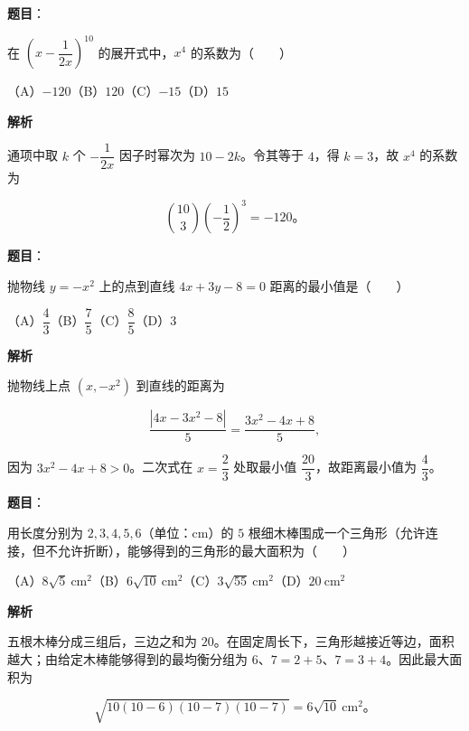 \begin{answer}

\textbf{题目}：

在 $\left(x-\dfrac1{2x}\right)^{10}$ 的展开式中，$x^4$ 的系数为\mbox{（　　）}

（A）$-120$\quad（B）$120$\quad（C）$-15$\quad（D）$15$

\textbf{解析}

通项中取 $k$ 个 $-\dfrac1{2x}$ 因子时幂次为 $10-2k$。令其等于 $4$，得 $k=3$，故 $x^4$ 的系数为

\nopagebreak[4]
\[
\binom{10}{3}\left(-\frac12\right)^3=-120\text{。}
\]


\end{answer}
\begin{answer}

\textbf{题目}：

抛物线 $y=-x^2$ 上的点到直线 $4x+3y-8=0$ 距离的最小值是\mbox{（　　）}

（A）$\dfrac43$\quad（B）$\dfrac75$\quad（C）$\dfrac85$\quad（D）$3$

\textbf{解析}

抛物线上点 $(x,-x^2)$ 到直线的距离为

\nopagebreak[4]
\[
\frac{|4x-3x^2-8|}{5}
=\frac{3x^2-4x+8}{5},
\]

因为 $3x^2-4x+8>0$。二次式在 $x=\dfrac23$ 处取最小值 $\dfrac{20}{3}$，故距离最小值为 $\dfrac43$。


\end{answer}
\begin{answer}

\textbf{题目}：

用长度分别为 $2,3,4,5,6$（单位：cm）的 $5$ 根细木棒围成一个三角形（允许连接，但不允许折断），能够得到的三角形的最大面积为\mbox{（　　）}

（A）$8\sqrt5\ \mathrm{cm}^2$\quad（B）$6\sqrt{10}\ \mathrm{cm}^2$\quad（C）$3\sqrt{55}\ \mathrm{cm}^2$\quad（D）$20\ \mathrm{cm}^2$

\textbf{解析}

五根木棒分成三组后，三边之和为 $20$。在固定周长下，三角形越接近等边，面积越大；由给定木棒能够得到的最均衡分组为 $6$、$7=2+5$、$7=3+4$。因此最大面积为

\nopagebreak[4]
\[
\sqrt{10(10-6)(10-7)(10-7)}=6\sqrt{10}\ \mathrm{cm}^2\text{。}
\]


\end{answer}

